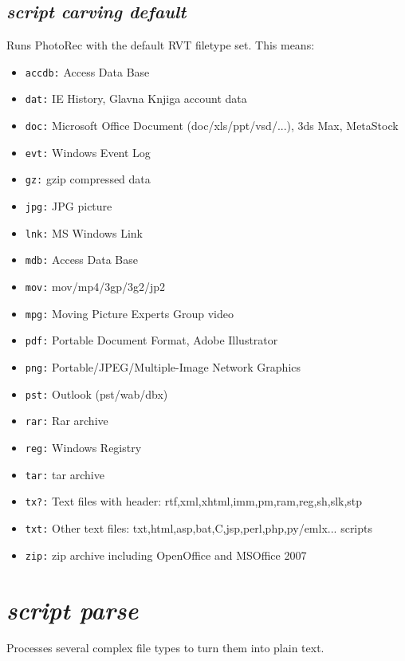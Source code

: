 \documentclass[a4paper,11pt,oneside]{report}
\begin{document}
\subsection{\emph{script carving default}} 

Runs PhotoRec with the default RVT filetype set. This means:
{ \footnotesize
\begin{itemize}
	\item 	\texttt{accdb:} Access Data Base
	\item 	\texttt{dat:} IE History, Glavna Knjiga account data
	\item 	\texttt{doc:} Microsoft Office Document (doc/xls/ppt/vsd/...), 3ds Max, MetaStock
	\item 	\texttt{evt:} Windows Event Log
	\item 	\texttt{gz:} gzip compressed data
	\item 	\texttt{jpg:} JPG picture
	\item 	\texttt{lnk:} MS Windows Link
	\item 	\texttt{mdb:} Access Data Base
	\item 	\texttt{mov:} mov/mp4/3gp/3g2/jp2
	\item 	\texttt{mpg:} Moving Picture Experts Group video
	\item 	\texttt{pdf:} Portable Document Format, Adobe Illustrator
	\item 	\texttt{png:} Portable/JPEG/Multiple-Image Network Graphics
	\item 	\texttt{pst:} Outlook (pst/wab/dbx)
	\item 	\texttt{rar:} Rar archive
	\item 	\texttt{reg:} Windows Registry
	\item 	\texttt{tar:} tar archive
	\item 	\texttt{tx?:} Text files with header: rtf,xml,xhtml,imm,pm,ram,reg,sh,slk,stp
	\item 	\texttt{txt:} Other text files: txt,html,asp,bat,C,jsp,perl,php,py/emlx... scripts
	\item 	\texttt{zip:} zip archive including OpenOffice and MSOffice 2007
\end{itemize}
}




\section{\emph{script parse}}

Processes several complex file types to turn them into plain text.
\end{document}
